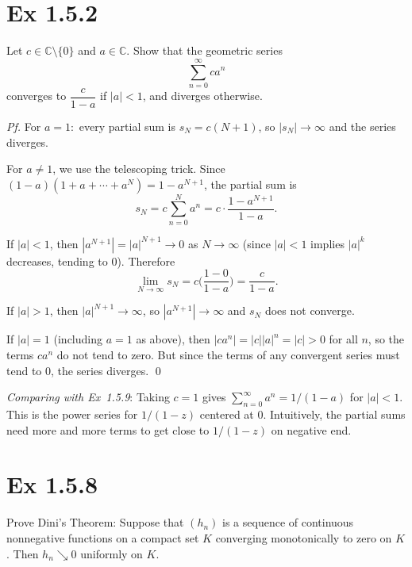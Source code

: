 \documentclass[a4paper]{article}
\begin{document}
\section*{Ex 1.5.2}

\begin{tcolorbox}[colback=gray!10, colframe=black, boxrule=0.5pt, arc=2mm]
Let $c \in \mathbb{C}\setminus\{0\}$ and $a \in \mathbb{C}$. Show that the geometric series
\[
\sum_{n=0}^{\infty} ca^n
\]
converges to $\dfrac{c}{1-a}$ if $|a| < 1$, and diverges otherwise.
\end{tcolorbox}

\textit{Pf.} For $a = 1:$
every partial sum is $s_N = c(N+1)$, so $|s_N| \to \infty$ and the series diverges.

\medskip\noindent
For $a \neq 1$,
we use the telescoping trick.  Since $(1-a)(1+a+\cdots+a^N) = 1 - a^{N+1}$, the partial sum is
\[
s_N = c\sum_{n=0}^N a^n = c\cdot\frac{1 - a^{N+1}}{1 - a}.
\]

If $|a| < 1$, then $|a^{N+1}| = |a|^{N+1} \to 0$ as $N \to \infty$ (since $|a| < 1$ implies $|a|^k$ decreases, tending to $0$).  Therefore
\[
\lim_{N\to\infty} s_N = c\bigl(\frac{1 - 0}{1 - a}\bigr) = \frac{c}{1-a}.
\]

If $|a| > 1$, then $|a|^{N+1} \to \infty$, so $|a^{N+1}| \to \infty$ and $s_N$ does not converge.

If $|a| = 1$ (including $a = 1$ as above), then $|ca^n| = |c||a|^n = |c| > 0$ for all $n$, so the terms $ca^n$ do not tend to zero.  But since the terms of any convergent series must tend to $0$, the series diverges. \qed

\medskip\noindent\textit{Comparing with Ex~1.5.9}:
Taking $c = 1$ gives $\sum_{n=0}^\infty a^n = 1/(1-a)$ for $|a| < 1$.  This is the power series for $1/(1-z)$ centered at $0$.  Intuitively, the partial sums need more and more terms to get close to $1/(1-z)$ on negative end.

\newpage
\section*{Ex 1.5.8}

\begin{tcolorbox}[colback=gray!10, colframe=black, boxrule=0.5pt, arc=2mm]
Prove Dini's Theorem: Suppose that $(h_n)$ is a sequence of continuous nonnegative functions on a compact set $K$ converging monotonically to zero on $K$. Then $h_n \searrow 0$ uniformly on $K$.
\end{tcolorbox}
\end{document}
